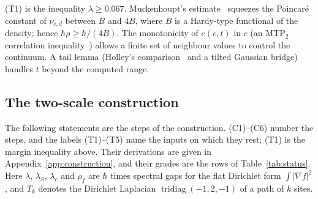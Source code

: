 \documentclass[11pt,a4paper]{article}
\theoremstyle{definition}
\theoremstyle{remark}
\newcommand{\hr}{\hbar\rho}
\begin{document}
(T1) is the inequality $\lambda\ge0.067$. Muckenhoupt's estimate~\cite{Mu,BR} squeezes the Poincaré constant of $\nu_{c,d}$ between $B$ and $4B$, where $B$ is a Hardy-type functional of the density; hence $\hr\ge\hbar/(4B)$. The monotonicity of $e(c,t)$ in $c$ (an MTP$_2$ correlation inequality~\cite{KR}) allows a finite set of neighbour values to control the continuum. A tail lemma (Holley's comparison~\cite{Ho} and a tilted Gaussian bridge) handles $t$ beyond the computed range.

\subsection{The two-scale construction}\label{sec:construction}

The following statements are the steps of the construction. (C1)--(C6) number the steps, and the labels (T1)--(T5) name the inputs on which they rest; (T1) is the margin inequality above. Their derivations are given in Appendix~\ref{app:construction}, and their grades are the rows of Table~\ref{tab:status}. Here $\lambda$, $\lambda_S$, $\lambda_c$ and $\rho_f$ are $\hbar$ times spectral gaps for the flat Dirichlet form $\int|\nabla f|^2$, and $T_k$ denotes the Dirichlet Laplacian $\operatorname{tridiag}(-1,2,-1)$ of a path of $k$ sites.
\end{document}
